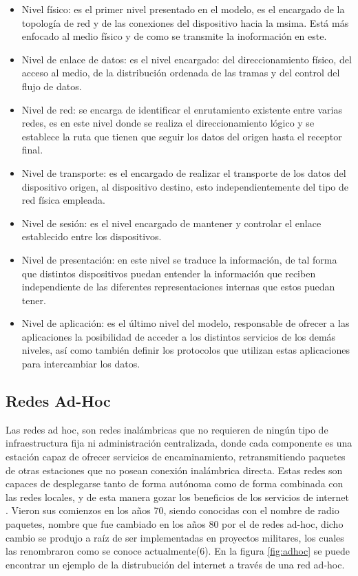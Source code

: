 \begin{itemize}
	\item Nivel físico: es el primer nivel presentado en el modelo, es el encargado de la topología de red y de las conexiones del dispositivo hacia la msima. Está más enfocado al medio físico y de como se transmite la inoformación en este.
	\item Nivel de enlace de datos: es el nivel encargado: del direccionamiento físico, del acceso al medio, de la distribución ordenada de las tramas y del control del flujo de datos.
	\item Nivel de red: se encarga de identificar el enrutamiento existente entre varias redes, es en este nivel donde se realiza el direccionamiento lógico y se establece la ruta que tienen que seguir los datos del origen hasta el receptor final.
	\item Nivel de transporte: es el encargado de realizar el transporte de los datos del dispositivo origen, al dispositivo destino, esto independientemente del tipo de red física empleada.
	\item Nivel de sesión: es el nivel encargado de mantener y controlar el enlace establecido entre los dispositivos.
	\item Nivel de presentación: en este nivel se traduce la información, de tal forma que distintos dispositivos puedan entender la información que reciben independiente de las diferentes representaciones internas que estos puedan tener.
	\item Nivel de aplicación: es el último nivel del modelo, responsable de ofrecer a las aplicaciones la posibilidad de acceder a los distintos servicios de los demás niveles, así como también definir los protocolos que utilizan estas aplicaciones para intercambiar los datos.
\end{itemize}

\subsection{Redes Ad-Hoc}
Las redes ad hoc, son redes inalámbricas que no requieren de ningún tipo de infraestructura fija ni administración centralizada, donde cada componente es una estación capaz de ofrecer servicios de encaminamiento, retransmitiendo paquetes de otras estaciones que no posean conexión inalámbrica directa. Estas redes son capaces de desplegarse tanto de forma autónoma como de forma combinada con las redes locales, y de esta manera gozar los beneficios de los servicios de internet \cite{orozco2012redes}. Vieron sus comienzos en los años 70, siendo conocidas con el nombre de radio paquetes, nombre que fue cambiado en los años 80 por el de redes ad-hoc, dicho cambio se produjo a raíz de ser implementadas en proyectos militares, los cuales las renombraron como se conoce actualmente(6). En la figura \ref{fig:adhoc} se puede encontrar un ejemplo de la distrubución del internet a través de una red ad-hoc.\\

